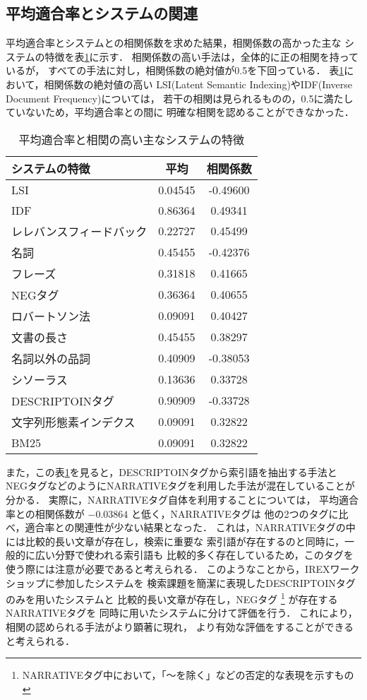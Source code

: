 \subsection{平均適合率とシステムの関連}
平均適合率とシステムとの相関係数を求めた結果，相関係数の高かった主な
システムの特徴を表\ref{pre_sys}に示す．
相関係数の高い手法は，全体的に正の相関を持っているが，
すべての手法に対し，相関係数の絶対値が0.5を下回っている．
表\ref{pre_sys}において，相関係数の絶対値の高い
LSI(Latent Semantic Indexing)やIDF(Inverse Document Frequency)については，
若干の相関は見られるものの，0.5に満たしていないため，平均適合率との間に
明確な相関を認めることができなかった．

\begin{table}[t]
\renewcommand{\arraystretch}{}
\caption{平均適合率と相関の高い主なシステムの特徴}
\centering
\small
\label{pre_sys}
\begin{tabular}{lcc} 
システムの特徴 		&   平均  & 相関係数 \\ \hline
LSI    			& 0.04545 & -0.49600 \\
IDF 			& 0.86364 &  0.49341 \\
レレバンスフィードバック& 0.22727 &  0.45499 \\
名詞 			& 0.45455 & -0.42376 \\
フレーズ 		& 0.31818 &  0.41665 \\
NEGタグ 		& 0.36364 &  0.40655 \\
ロバートソン法   	& 0.09091 &  0.40427 \\
文書の長さ 		& 0.45455 &  0.38297 \\
名詞以外の品詞 		& 0.40909 & -0.38053 \\
シソーラス 		& 0.13636 &  0.33728 \\
DESCRIPTOINタグ 	& 0.90909 & -0.33728 \\
文字列形態素インデクス 	& 0.09091 &  0.32822 \\
BM25 			& 0.09091 &  0.32822 \\ \hline
\end{tabular}
\end{table}

また，この表\ref{pre_sys}を見ると，DESCRIPTOINタグから索引語を抽出する手法と
NEGタグなどのようにNARRATIVEタグを利用した手法が混在していることが分かる．
実際に，NARRATIVEタグ自体を利用することについては，
平均適合率との相関係数が $-0.03864$ と低く，NARRATIVEタグは
他の2つのタグに比べ，適合率との関連性が少ない結果となった．
これは，NARRATIVEタグの中には比較的長い文章が存在し，検索に重要な
索引語が存在するのと同時に，一般的に広い分野で使われる索引語も
比較的多く存在しているため，このタグを使う際には注意が必要であると考えられる．
このようなことから，IREXワークショップに参加したシステムを
検索課題を簡潔に表現したDESCRIPTOINタグのみを用いたシステムと
比較的長い文章が存在し，NEGタグ
\footnote{NARRATIVEタグ中において，「〜を除く」などの否定的な表現を示すもの}
が存在するNARRATIVEタグを
同時に用いたシステムに分けて評価を行う．
これにより，相関の認められる手法がより顕著に現れ，
より有効な評価をすることができると考えられる．




